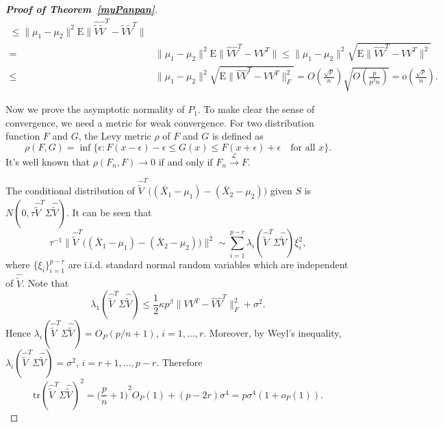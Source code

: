\documentclass[review]{elsarticle}
\theoremstyle{plain}
\theoremstyle{definition}
\theoremstyle{remark}
\begin{document}
\begin{proof}[\textbf{Proof of Theorem~\ref{myPanpan}}]
\begin{equation*}
\begin{aligned}
            \leq 
            \|\mu_1-\mu_2\|^2\mathrm{E}\|\hat{\tilde{V}}\hat{\tilde{V}}^T-\tilde{V}\tilde{V}^T\|\\
            =& 
            \|\mu_1-\mu_2\|^2\mathrm{E}\|\hat{V}\hat{V}^T-VV^T\|
            \leq 
            \|\mu_1-\mu_2\|^2\sqrt{\mathrm{E}\|\hat{V}\hat{V}^T-VV^T\|^2}\\
            \leq &
            \|\mu_1-\mu_2\|^2\sqrt{\mathrm{E}\|\hat{V}\hat{V}^T-VV^T\|^2_F}
            =O(\frac{\sqrt{p}}{n})\sqrt{O(\frac{p}{p^{\beta}n})}=o(\frac{\sqrt{p}}{n}).
        \end{aligned}
    \end{equation*}

    Now we prove the asymptotic normality of $P_1$. To make clear the sense of convergence, we need a metric for weak convergence. For two distribution function $F$ and $G$, the Levy metric $\rho$ of $F$ and $G$ is defined as
    $$
   \rho(F,G) =\inf\{\epsilon:F(x-\epsilon)-\epsilon\leq G(x)\leq F(x+\epsilon)+\epsilon\quad \textrm{for all $x$}\}.
    $$
    It's well known that $\rho(F_n,F)\to 0$ if and only if $F_n\xrightarrow{\mathcal{L}}F$.

    The conditional distribution of
    $\hat{\tilde{V}}^T\big((\bar{X}_1-\mu_1)-(\bar{X}_2-\mu_2)\big)$ given $S$ is $N(0,\tau \hat{\tilde{V}}^T\Sigma\hat{\tilde{V}})$.
It can be seen that 
$$\tau^{-1}\big\|\hat{\tilde{V}}^T\big((\bar{X}_1-\mu_1)-(\bar{X}_2-\mu_2)\big)\big\|^2
\sim
    \sum_{i=1}^{p-r} \lambda_i(\hat{\tilde{V}}^T\Sigma\hat{\tilde{V}})\xi_i^2,
    $$
where $\{\xi_i\}_{i=1}^{p-r}$ are i.i.d. standard normal random variables which are independent of $\hat{\tilde{V}}$.
    Note that
    $$
     \lambda_1(\hat{\tilde{V}}^T\Sigma\hat{\tilde{V}})\leq 
    \frac{1}{2}\kappa p^\beta \|VV^T -\hat{V}\hat{V}^T\|^2_F+\sigma^2.
    $$
    Hence $\lambda_i(\hat{\tilde{V}}^T\Sigma\hat{\tilde{V}})=O_P({p}/{n}+1)$, $i=1,\ldots,r$.
    Moreover, by Weyl's inequality,
    $
    \lambda_i(\hat{\tilde{V}}^T\Sigma\hat{\tilde{V}})=\sigma^2
    $, $i=r+1,\ldots,p-r$.
    Therefore
\begin{equation}\label{traceA1}
\mathrm{tr}(\hat{\tilde{V}}^T\Sigma\hat{\tilde{V}})^2=
    {\big(\frac{p}{n}+1\big)}^2O_P(1)
    +
    (p-2r)\sigma^4
    =p\sigma^4(1+o_P(1)).
\end{equation}


\end{proof}
\end{document}
